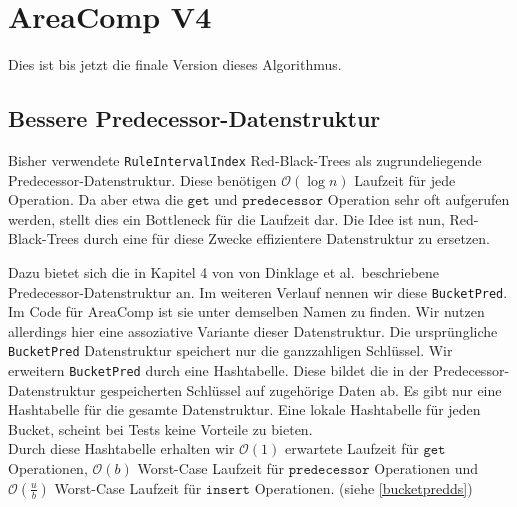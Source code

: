 



\section{AreaComp V4}
\label{v4}

Dies ist bis jetzt die finale Version dieses Algorithmus. 

\subsection{Bessere Predecessor-Datenstruktur}

Bisher verwendete \texttt{RuleIntervalIndex} Red-Black-Trees als zugrundeliegende Predecessor-Datenstruktur. Diese benötigen $\mathcal{O}(\log n)$ Laufzeit für jede Operation. Da aber etwa die $\texttt{get}$ und $\texttt{predecessor}$ Operation sehr oft aufgerufen werden, stellt dies ein Bottleneck für die Laufzeit dar.
Die Idee ist nun, Red-Black-Trees durch eine für diese Zwecke effizientere Datenstruktur zu ersetzen.

Dazu bietet sich die in Kapitel 4 von \cite{dinklage_engineering_2021} von Dinklage et al.\ beschriebene Predecessor-Datenstruktur an. Im weiteren Verlauf nennen wir diese \texttt{BucketPred}. Im Code für AreaComp ist sie unter demselben Namen zu finden. Wir nutzen allerdings hier eine assoziative Variante dieser Datenstruktur. Die ursprüngliche \texttt{BucketPred} Datenstruktur speichert nur die ganzzahligen Schlüssel. Wir erweitern \texttt{BucketPred} durch eine Hashtabelle. Diese bildet die in der Predecessor-Datenstruktur gespeicherten Schlüssel auf zugehörige Daten ab. Es gibt nur eine Hashtabelle für die gesamte Datenstruktur.   
Eine lokale Hashtabelle für jeden Bucket, scheint bei Tests keine Vorteile zu bieten.\\
Durch diese Hashtabelle erhalten wir $\mathcal{O}(1)$ erwartete Laufzeit für $\texttt{get}$ Operationen, $\mathcal{O}(b)$ Worst-Case Laufzeit für $\texttt{predecessor}$ Operationen und $\mathcal{O}(\tfrac{u}{b})$ Worst-Case Laufzeit für $\texttt{insert}$ Operationen. (siehe \autoref{bucketpredds}) 

